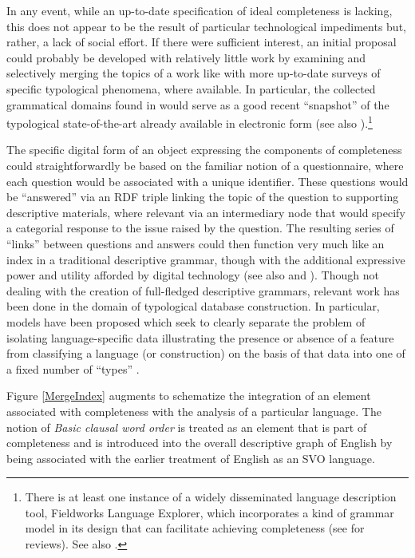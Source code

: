 In any event, while an up-to-date specification of ideal completeness is
lacking, this does not appear to be the result of particular technological
impediments but, rather, a lack of social effort. If there were sufficient
interest, an initial proposal could probably be developed with relatively little
work by examining and selectively merging the topics of a work like
 with more up-to-date surveys of specific typological
phenomena, where available. In particular, the collected grammatical domains
found in  would serve as a good recent ``snapshot'' of the
typological state-of-the-art already available in electronic form (see also
).{\footnote{There is at least one instance
of a widely disseminated language description tool, Fieldworks Language
Explorer, which incorporates a kind of grammar model in its design that can
facilitate achieving completeness (see
 for reviews). See also \citet{Blacktv}.}}

The specific digital form of an object expressing the components of 
completeness could straightforwardly be based on the familiar notion of a
questionnaire, where each question would be associated with a unique identifier.
These questions would be ``answered'' via an RDF triple linking the topic of the
question to supporting descriptive materials, where relevant via an intermediary
node that would specify a categorial response to the issue raised by the
question. The resulting series of ``links'' between questions and answers could
then function very much like an index in a traditional descriptive grammar,
though with the additional expressive power and utility afforded by digital
technology (see also  and
). Though not dealing with the creation of
full-fledged descriptive grammars, relevant work has been done in the domain of
typological database construction. In particular, models have been proposed
which seek to clearly separate the problem of isolating language-specific data
illustrating the presence or absence of a feature from classifying a language
(or construction) on the basis of that data into one of a fixed number of
``types'' \citep{BickelNichols:2002,Cysouw:2007:Social}.

Figure \ref{MergeIndex} augments  to schematize the integration
of an element associated with completeness with the analysis of a
particular language. The notion of \emph{Basic clausal word order} is treated
as an element that is part of completeness and is introduced into the overall
descriptive graph of English by being associated with the earlier treatment
of English as an SVO language.

